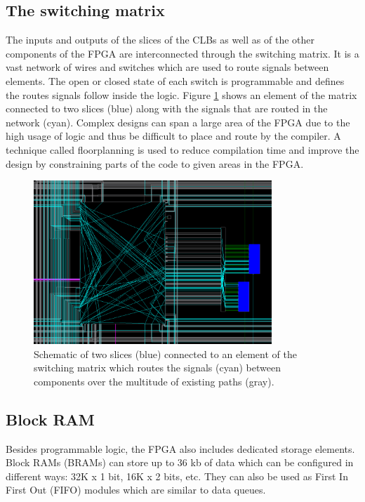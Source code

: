     \subsection{The switching matrix}

      The inputs and outputs of the slices of the CLBs as well as of the other components of the FPGA are interconnected through the switching matrix. It is a vast network of wires and switches which are used to route signals between elements. The open or closed state of each switch is programmable and defines the routes signals follow inside the logic. Figure \ref{fig:II-6-switch} shows an element of the matrix connected to two slices (blue) along with the signals that are routed in the network (cyan). Complex designs can span a large area of the FPGA due to the high usage of logic and thus be difficult to place and route by the compiler. A technique called floorplanning is used to reduce compilation time and improve the design by constraining parts of the code to given areas in the FPGA.

      \begin{figure}[h!]
        \centering
        \includegraphics[width=0.8\textwidth]{img/II-6-irradiation/switch.png}
        \caption{Schematic of two slices (blue) connected to an element of the switching matrix which routes the signals (cyan) between components over the multitude of existing paths (gray).}
        \label{fig:II-6-switch}
      \end{figure}

    \subsection{Block RAM}

      Besides programmable logic, the FPGA also includes dedicated storage elements. Block RAMs \cite{VIRTEX-RAM} (BRAMs) can store up to 36 kb of data which can be configured in different ways: 32K x 1 bit, 16K x 2 bits, etc. They can also be used as First In First Out (FIFO) modules which are similar to data queues.

